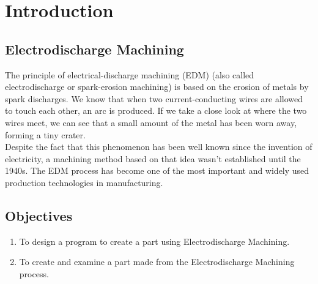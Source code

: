 \chapter{Introduction}
\lhead{\leftmark}
\label{sec:introduction}
\section{Electrodischarge Machining}
The principle of electrical-discharge machining (EDM) (also called electrodischarge or spark-erosion machining) is based on the erosion of metals by spark discharges. We know that when two current-conducting wires are allowed to touch each other, an arc is produced. If we take a close look at where the two wires meet, we can see that a small amount of the metal has been worn away, forming a tiny crater.\\
Despite the fact that this phenomenon has been well known since the invention of electricity, a machining method based on that idea wasn't established until the 1940s. The EDM process has become one of the most important and widely used production technologies in manufacturing.
\section{Objectives}
\begin{enumerate}
\item To design a program to create a part using Electrodischarge Machining.
\item To create and examine a part made from the Electrodischarge Machining process.
\end{enumerate}
